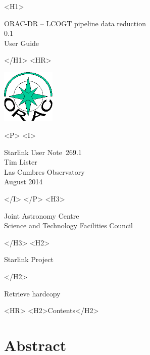 \documentclass[twoside,11pt]{article}
\newcommand{\stardoccategory}  {Starlink User Note}
\newcommand{\stardocsource}    {sun\stardocnumber}
\newcommand{\stardocnumber}    {269.1}
\newcommand{\stardocauthors}   {Tim Lister \\
                                Las Cumbres Observatory}
\newcommand{\stardocdate}      {August 2014}
\newcommand{\stardoctitle}     {ORAC-DR -- LCOGT pipeline data reduction}
\newcommand{\stardocversion}   {0.1}
\newcommand{\stardocmanual}    {User Guide}
\newcommand{\htmladdnormallink}[2]{#1}
\newcommand{\htmladdimg}[1]{}
\newcommand{\htmlref}[2]{#1}
\newcommand{\htmladdtonavigation}[1]{}
\newcommand{\xlabel}[1]{}
\renewcommand{\_}{\texttt{\symbol{95}}}
\begin{document}
\begin{htmlonly}
   \xlabel{}
   \begin{rawhtml} <H1> \end{rawhtml}
      \stardoctitle\\
      \stardocversion\\
      \stardocmanual
   \begin{rawhtml} </H1> <HR> \end{rawhtml}

\includegraphics[width=1.0in]{sun260_logo}

   \begin{rawhtml} <P> <I> \end{rawhtml}
   \stardoccategory\ \stardocnumber \\
   \stardocauthors \\
   \stardocdate
   \begin{rawhtml} </I> </P> <H3> \end{rawhtml}
      \htmladdnormallink{Joint Astronomy Centre}
                        {http://www.jach.hawaii.edu/} \\
      \htmladdnormallink{Science and Technology Facilities Council}
                        {http://www.scitech.ac.uk/} \\
   \begin{rawhtml} </H3> <H2> \end{rawhtml}
      \htmladdnormallink{Starlink Project}{http://www.starlink.ac.uk/}
   \begin{rawhtml} </H2> \end{rawhtml}
   \htmladdnormallink{\htmladdimg{source.gif} Retrieve hardcopy}
      {http://www.starlink.ac.uk/cgi-bin/hcserver?\stardocsource}\\

  \label{stardoccontents}
  \begin{rawhtml}
    <HR>
    <H2>Contents</H2>
  \end{rawhtml}
  \htmladdtonavigation{\htmlref{\htmladdimg{contents_motif.gif}}
        {stardoccontents}}

  \section{\xlabel{abstract}Abstract}
\end{htmlonly}
\end{document}
